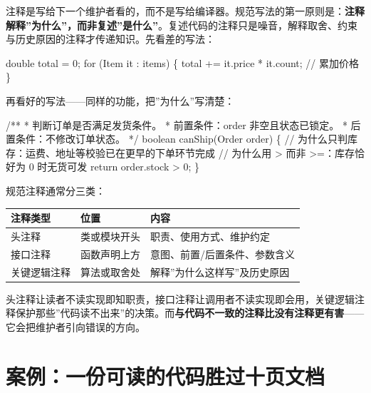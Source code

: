 \documentclass[
]{ctexbook}
\newenvironment{Shaded}{
  \ttfamily\small
}{}
\newcommand{\NormalTok}[1]{#1}
\newcounter{none}
\begin{document}
注释是写给下一个维护者看的，而不是写给编译器。规范写法的第一原则是：\textbf{注释解释''为什么''，而非复述''是什么''}。复述代码的注释只是噪音，解释取舍、约束与历史原因的注释才传递知识。先看差的写法：

\begin{Shaded}
\begin{Highlighting}[]
\NormalTok{double total = 0;}
\NormalTok{for (Item it : items) \{}
\NormalTok{    total += it.price * it.count;   // 累加价格}
\NormalTok{\}}
\end{Highlighting}
\end{Shaded}

再看好的写法------同样的功能，把''为什么''写清楚：

\begin{Shaded}
\begin{Highlighting}[]
\NormalTok{/**}
\NormalTok{ * 判断订单是否满足发货条件。}
\NormalTok{ * 前置条件：order 非空且状态已锁定。}
\NormalTok{ * 后置条件：不修改订单状态。}
\NormalTok{ */}
\NormalTok{boolean canShip(Order order) \{}
\NormalTok{    // 为什么只判库存：运费、地址等校验已在更早的下单环节完成}
\NormalTok{    // 为什么用 \textgreater{} 而非 \textgreater{}=：库存恰好为 0 时无货可发}
\NormalTok{    return order.stock \textgreater{} 0;}
\NormalTok{\}}
\end{Highlighting}
\end{Shaded}

规范注释通常分三类：

{\def\LTcaptype{none} %
\begin{longtable}[]{@{}lll@{}}
\toprule\noalign{}
注释类型 & 位置 & 内容 \\
\midrule\noalign{}
\endhead
\bottomrule\noalign{}
\endlastfoot
头注释 & 类或模块开头 & 职责、使用方式、维护约定 \\
接口注释 & 函数声明上方 & 意图、前置/后置条件、参数含义 \\
关键逻辑注释 & 算法或取舍处 & 解释''为什么这样写''及历史原因 \\
\end{longtable}
}

头注释让读者不读实现即知职责，接口注释让调用者不读实现即会用，关键逻辑注释保护那些''代码读不出来''的决策。而\textbf{与代码不一致的注释比没有注释更有害}------它会把维护者引向错误的方向。

\section{案例：一份可读的代码胜过十页文档}\label{ux6848ux4f8bux4e00ux4efdux53efux8bfbux7684ux4ee3ux7801ux80dcux8fc7ux5341ux9875ux6587ux6863}
\end{document}
